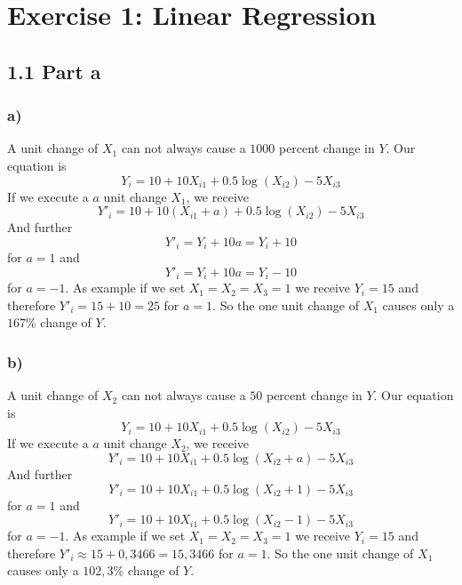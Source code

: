 \documentclass[a4paper]{article}
\begin{document}





\section*{Exercise 1: Linear Regression}
    \subsection*{1.1 Part a}
        \subsubsection*{a)}
            A unit change of $X_1$ can not always cause a $1000$ percent change in $Y$.
            Our equation is
            $$Y_i = 10 + 10 X_{i1} + 0.5 \log(X_{i2}) - 5 X_{i3}$$
            If we execute a $a$ unit change $X_1$, we receive
            $$Y'_i = 10 + 10 (X_{i1} + a) + 0.5 \log(X_{i2}) - 5 X_{i3}$$
            And further
            $$Y'_i = Y_i + 10a = Y_i + 10$$
            for $a=1$ and
            $$Y'_i = Y_i + 10a = Y_i - 10$$
            for $a=-1$.
            As example if we set $X_1 = X_2 = X_3 =1$ we receive $Y_i = 15$ and therefore $Y'_i = 15+10=25$ for $a=1$.
            So the one unit change of $X_1$ causes only a $167\%$ change of $Y$.
        
        \subsubsection*{b)}
            A unit change of $X_2$ can not always cause a $50$ percent change in $Y$.
            Our equation is
            $$Y_i = 10 + 10 X_{i1} + 0.5 \log(X_{i2}) - 5 X_{i3}$$
            If we execute a $a$ unit change $X_2$, we receive
            $$Y'_i = 10 + 10 X_{i1} + 0.5 \log(X_{i2} + a) - 5 X_{i3}$$
            And further
            $$Y'_i = 10 + 10 X_{i1} + 0.5 \log(X_{i2} + 1) - 5 X_{i3}$$
            for $a=1$ and
            $$Y'_i = 10 + 10 X_{i1} + 0.5 \log(X_{i2} - 1) - 5 X_{i3}$$
            for $a=-1$.
            As example if we set $X_1 = X_2 = X_3 =1$ we receive $Y_i = 15$ and therefore $Y'_i \approx 15 + 0,3466 = 15,3466$ for $a=1$.
            So the one unit change of $X_1$ causes only a $102,3\%$ change of $Y$.
        
\end{document}
